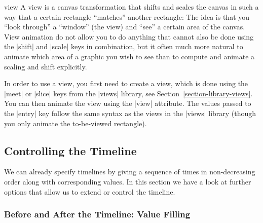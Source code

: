 \begin{tikzanimateattribute}{view}
    A view is a canvas transformation that shifts and scales the canvas in such
    a way that a certain rectangle ``matches'' another rectangle: The idea is
    that you ``look through'' a ``window'' (the view) and ``see'' a certain
    area of the canvas. View animation do not allow you to do anything that
    cannot also be done using the |shift| and |scale| keys in combination, but
    it often much more natural to animate which area of a graphic you wish to
    see than to compute and animate a scaling and shift explicitly.

    In order to use a view, you first need to create a view, which is done
    using the |meet| or |slice| keys from the |views| library, see
    Section~\ref{section-library-views}. You can then animate the view using
    the |view| attribute. The values passed to the |entry| key follow the same
    syntax as the views in the |views| library (though you only animate the
    to-be-viewed rectangle).
\begin{codeexample}[imagesource={standalone/pgfmanual-en-tikz-animations-animation-51.svg}]
\end{codeexample}
\end{tikzanimateattribute}


\subsection{Controlling the Timeline}
\label{section-anim-timeline}

We can already specify timelines by giving a sequence of times in
non-decreasing order along with corresponding values. In this section we have a
look at further options that allow us to extend or control the timeline.


\subsubsection{Before and After the Timeline: Value Filling}

